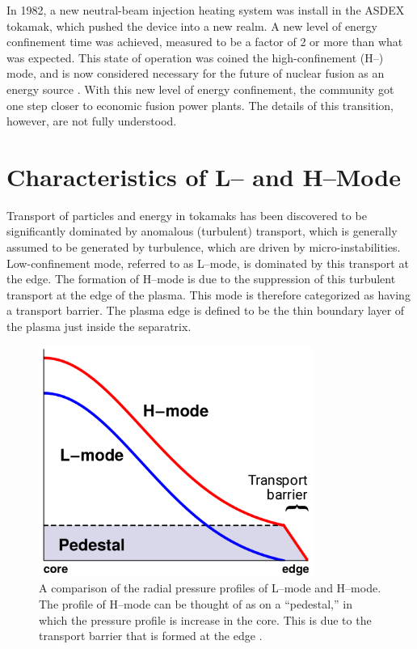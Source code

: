 In 1982, a new neutral-beam injection heating system was install in the ASDEX tokamak, which pushed the device into a new realm.
A new level of energy confinement time was achieved, measured to be a factor of 2 or more than what was expected.
This state of operation was coined the high-confinement (H--) mode, and is now considered necessary for the future of nuclear fusion as an energy source \cite{arnoux_how_2009} \cite{wagner_development_1984}.
With this new level of energy confinement, the community got one step closer to economic fusion power plants.
The details of this transition, however, are not fully understood.

\section{Characteristics of L-- and H--Mode}\label{sec:characteristics}
Transport of particles and energy in tokamaks has been discovered to be significantly dominated by anomalous (turbulent) transport, which is generally assumed to be generated by turbulence, which are driven by micro-instabilities.
Low-confinement mode, referred to as L--mode, is dominated by this transport at the edge.
The formation of H--mode is due to the suppression of this turbulent transport at the edge of the plasma.
This mode is therefore categorized as having a transport barrier.
The plasma edge is defined to be the thin boundary layer of the plasma just inside the separatrix.

\begin{figure}[tb] %
\begin{minipage}{0.49\linewidth}
	\centering
	\includegraphics[width=0.8\textwidth]{../Graphics/L-mode_H-mode_compare.png}
\end{minipage}
\hfill
\begin{minipage}{0.49\linewidth}
	\caption{A comparison of the radial pressure profiles of L--mode and H--mode.
	The profile of H--mode can be thought of as on a ``pedestal,'' in which the pressure profile is increase in the core.
	This is due to the transport barrier that is formed at the edge \cite{weymiens_bifurcation_2014}.}
	\label{fig:L-mode_H-mode_compare}
\end{minipage}
\end{figure}

